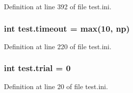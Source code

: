Definition at line 392 of file test.\-ini.

\hypertarget{namespacetest_a69079090d6416ccf53f5c565fa229a77}{
\subsubsection[{timeout}]{\setlength{\rightskip}{0pt plus 5cm}int test.\-timeout = max(10, {\bf np})}}\label{namespacetest_a69079090d6416ccf53f5c565fa229a77}


Definition at line 220 of file test.\-ini.

\hypertarget{namespacetest_a0e85c866c38cad5d7ae36d1115224da0}{
\subsubsection[{trial}]{\setlength{\rightskip}{0pt plus 5cm}int test.\-trial = 0}}\label{namespacetest_a0e85c866c38cad5d7ae36d1115224da0}


Definition at line 20 of file test.\-ini.


